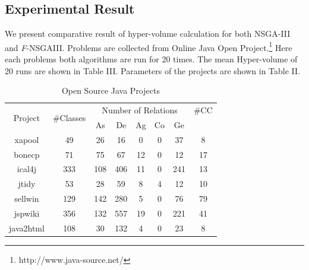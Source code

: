 \documentclass[letterpaper, 10 pt, conference]{ieeeconf}  %
\begin{document}
\subsection{Experimental Result}
We present comparative result of hyper-volume calculation for both NSGA-III and \textit{F}-NSGAIII. Problems are collected from Online Java Open Project.\footnote{http://www.java-source.net/}
Here each problems both algorithms are run for 20 times.
The mean Hyper-volume of 20 runs are shown in Table III.
Parameters of the projects are shown in Table II.
\begin{table}[!h]


\begin{center}
\caption{Open Source Java Projects}

\begin{tabular}{ |c|c|c|c|c|c|c|c| } 

\hline \multirow{2}{*}{Project } &	\multirow{2}{*}{\#Classes}&	\multicolumn{5}{|c|}{Number of Relations} & \#CC\\ \cline{3-7}
& & As & De & Ag & Co & Ge & \\ \hline

xapool & 49 & 26 & 16 & 0 & 0 & 37 & 8 \\
\hline

bonecp & 71 & 75 & 67 & 12 & 0 & 12 & 17 \\
\hline

ical4j & 333 & 108 & 406 & 11 & 0 & 241 & 13 \\
\hline

jtidy & 53 & 28 & 59 & 8 & 4 & 12 & 10 \\
\hline


sellwin & 129 & 142 & 280 & 5 & 0 & 76 & 79 \\
\hline

jspwiki & 356 & 132 & 557 & 19 & 0 & 221 & 41 \\ \hline 

java2html & 108 & 30 & 132 & 4 & 0 & 23 & 8 \\
\hline

\end{tabular}

\end{center}
\end{table}
\end{document}
